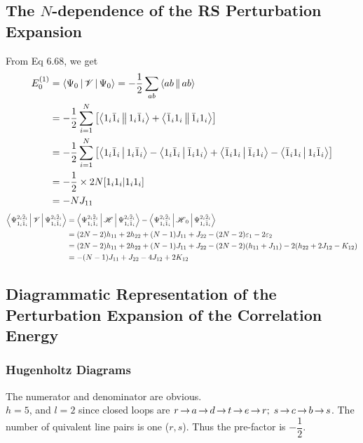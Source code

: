 \documentclass[a4paper]{article}
\begin{document}
\subsection{The $ N $-dependence of the RS Perturbation Expansion}
From Eq 6.68, we get
\begin{align}
E_0^{(1)} &= \Braket{\Psi_0 | \mathscr{V} | \Psi_0} = -\dfrac{1}{2}\sum_{ab}\Braket{ab||ab} \notag\\
&= -\dfrac{1}{2}\sum_{i=1}^N \qty[\Braket{1_i \bar{1}_i|| 1_i \bar{1}_i} + \Braket{\bar{1}_i 1_i || \bar{1}_i 1_i}] \notag\\
&= -\dfrac{1}{2}\sum_{i=1}^N 
\qty[\Braket{1_i \bar{1}_i| 1_i \bar{1}_i} 
- \Braket{1_i \bar{1}_i| \bar{1}_i 1_i} 
+ \Braket{\bar{1}_i 1_i | \bar{1}_i 1_i}
- \Braket{\bar{1}_i 1_i | 1_i \bar{1}_i} ] \notag\\
&= -\dfrac{1}{2}\times 2N [1_i 1_i| 1_i 1_i] \notag\\
&= -N J_{11}
\end{align}
\begin{align}
\Braket{\Psi_{1_i\bar{1}_i}^{2_i\bar{2}_i} | \mathscr{V} | \Psi_{1_i\bar{1}_i}^{2_i\bar{2}_i}} 
&= \Braket{\Psi_{1_i\bar{1}_i}^{2_i\bar{2}_i} | \operatorname{\mathscr{H}} | \Psi_{1_i\bar{1}_i}^{2_i\bar{2}_i}} 
- \Braket{\Psi_{1_i\bar{1}_i}^{2_i\bar{2}_i} | \operatorname{\mathscr{H}}_0 | \Psi_{1_i\bar{1}_i}^{2_i\bar{2}_i}} \notag\\
&= (2N-2) h_{11} + 2h_{22} + (N-1)J_{11} + J_{22} - (2N-2)\varepsilon_1 - 2\varepsilon_2 \notag\\
&= (2N-2) h_{11} + 2h_{22} + (N-1)J_{11} + J_{22} - (2N-2)(h_{11} + J_{11}) - 2(h_{22} + 2J_{12} - K_{12}) \notag\\
&= -(N-1)J_{11} + J_{22} - 4J_{12} + 2K_{12}
\end{align}

\subsection{Diagrammatic Representation of the Perturbation Expansion of the Correlation Energy}

\subsubsection{Hugenholtz Diagrams}
The numerator and denominator are obvious.\\
$ h=5 $, and $ l=2 $ since closed loops are $ r\operatorname{\rightarrow} a\operatorname{\rightarrow} d\operatorname{\rightarrow} t\operatorname{\rightarrow} e\operatorname{\rightarrow} r; \; s\operatorname{\rightarrow} c\operatorname{\rightarrow} b\operatorname{\rightarrow} s $. The number of quivalent line pairs is one ($ r,s $). Thus the pre-factor is $ -\dfrac{1}{2} $.
\end{document}
